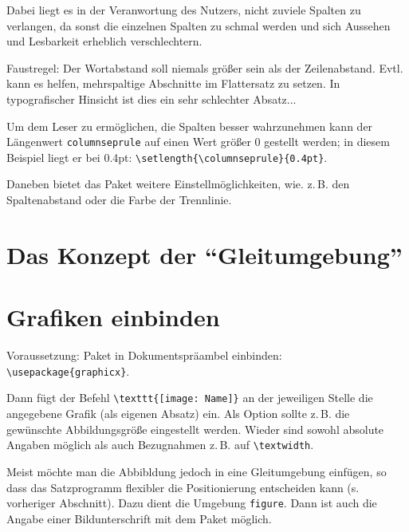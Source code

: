 \setlength{\columnseprule}{0.4pt}
\begin{multicols}{3}
 Dabei liegt es in der Veranwortung des Nutzers, nicht zuviele Spalten zu verlangen,
 da sonst die einzelnen Spalten zu schmal werden und sich Aussehen und Lesbarkeit erheblich
 verschlechtern.
 
 Faustregel: Der Wortabstand soll niemals größer sein als der Zeilenabstand.
 Evtl. kann es helfen, mehrspaltige Abschnitte im Flattersatz zu setzen.
 In typografischer Hinsicht ist dies ein sehr schlechter Absatz...
 
 Um dem Leser zu ermöglichen, die Spalten besser wahrzunehmen kann der Längenwert 
 \lstinline/columnseprule/ auf einen Wert größer 0 gestellt werden;
 in diesem Beispiel liegt er bei 0.4pt: \lstinline/\setlength{\columnseprule}{0.4pt}/.
 
 Daneben bietet das Paket weitere Einstellmöglichkeiten, wie. z.\,B. den Spaltenabstand
 oder die Farbe der Trennlinie.
\end{multicols}



\section{Das Konzept der \enquote{Gleitumgebung}}


\section{Grafiken einbinden}
\label{grafik-einbinden}

Voraussetzung: Paket  in Dokumentspräambel einbinden:
\lstinline/\usepackage{graphicx}/.

Dann fügt der Befehl \lstinline/\texttt{[image: Name]}/ an der jeweiligen Stelle
die angegebene Grafik (als eigenen Absatz) ein.
Als Option sollte z.\,B. die gewünschte Abbildungsgröße eingestellt werden.
Wieder sind sowohl absolute Angaben möglich als auch Bezugnahmen z.\,B. auf 
\lstinline/\textwidth/.

Meist möchte man die Abbibldung jedoch in eine Gleitumgebung einfügen, so dass das Satzprogramm
flexibler die Positionierung entscheiden kann (s. vorheriger Abschnitt).
Dazu dient die Umgebung \lstinline/figure/.
Dann ist auch die Angabe einer Bildunterschrift mit dem Paket  möglich.

